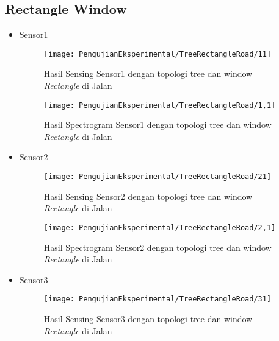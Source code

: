 \subsection{Rectangle Window}
\begin{itemize}
\item Sensor1
\begin{figure}[H]
	\centering
	\texttt{[image: PengujianEksperimental/TreeRectangleRoad/11]}
	\caption[Hasil Sensing Sensor1 dengan topologi tree dan window {\it Rectangle} di Jalan]{Hasil Sensing Sensor1 dengan topologi tree dan window {\it Rectangle} di Jalan} 
	\label{fig:hasilJalanTreeRect11}
\end{figure}

\begin{figure}[H]
	\centering
	\texttt{[image: PengujianEksperimental/TreeRectangleRoad/1,1]}
	\caption[Hasil Spectrogram Sensor1 dengan topologi tree dan window {\it Rectangle} di Jalan]{Hasil Spectrogram Sensor1 dengan topologi tree dan window {\it Rectangle} di Jalan} 
	\label{fig:hasilJalanTreeRect1,1}
\end{figure}

\item Sensor2
\begin{figure}[H]
	\centering
	\texttt{[image: PengujianEksperimental/TreeRectangleRoad/21]}
	\caption[Hasil Sensing Sensor2 dengan topologi tree dan window {\it Rectangle} di Jalan]{Hasil Sensing Sensor2 dengan topologi tree dan window {\it Rectangle} di Jalan} 
	\label{fig:hasilJalanTreeRect21}
\end{figure}

\begin{figure}[H]
	\centering
	\texttt{[image: PengujianEksperimental/TreeRectangleRoad/2,1]}
	\caption[Hasil Spectrogram Sensor2 dengan topologi tree dan window {\it Rectangle} di Jalan]{Hasil Spectrogram Sensor2 dengan topologi tree dan window {\it Rectangle} di Jalan} 
	\label{fig:hasilJalanTreeRect2,1}
\end{figure}

\item Sensor3
\begin{figure}[H]
	\centering
	\texttt{[image: PengujianEksperimental/TreeRectangleRoad/31]}
	\caption[Hasil Sensing Sensor3 dengan topologi tree dan window {\it Rectangle} di Jalan]{Hasil Sensing Sensor3 dengan topologi tree dan window {\it Rectangle} di Jalan} 
	\label{fig:hasilJalanTreeRect31}
\end{figure}


\end{itemize}
